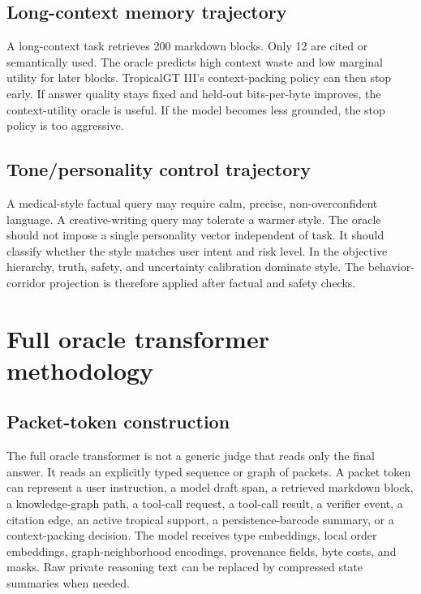\documentclass[11pt]{article}
\theoremstyle{definition}
\theoremstyle{remark}
\numberwithin{equation}{section}
\begin{document}
\subsection{Long-context memory trajectory}
A long-context task retrieves 200 markdown blocks.  Only 12 are cited or semantically used.  The oracle predicts high context waste and low marginal utility for later blocks.  TropicalGT III's context-packing policy can then stop early.  If answer quality stays fixed and held-out bits-per-byte improves, the context-utility oracle is useful.  If the model becomes less grounded, the stop policy is too aggressive.

\subsection{Tone/personality control trajectory}
A medical-style factual query may require calm, precise, non-overconfident language.  A creative-writing query may tolerate a warmer style.  The oracle should not impose a single personality vector independent of task.  It should classify whether the style matches user intent and risk level.  In the objective hierarchy, truth, safety, and uncertainty calibration dominate style.  The behavior-corridor projection is therefore applied after factual and safety checks.


\section{Full oracle transformer methodology}

\subsection{Packet-token construction}
The full oracle transformer is not a generic judge that reads only the final answer.  It reads an explicitly typed sequence or graph of packets.  A packet token can represent a user instruction, a model draft span, a retrieved markdown block, a knowledge-graph path, a tool-call request, a tool-call result, a verifier event, a citation edge, an active tropical support, a persistence-barcode summary, or a context-packing decision.  The model receives type embeddings, local order embeddings, graph-neighborhood encodings, provenance fields, byte costs, and masks.  Raw private reasoning text can be replaced by compressed state summaries when needed.
\end{document}
